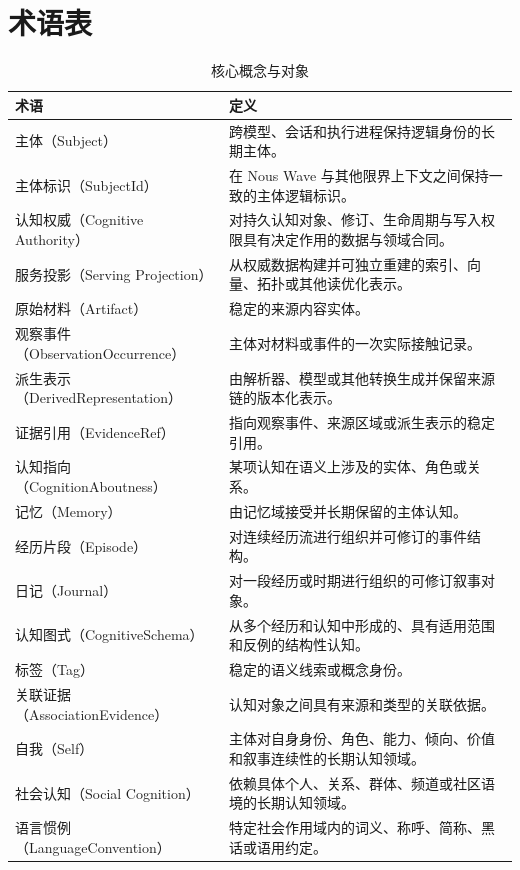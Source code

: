 \chapter{术语表}

\begin{longtable}{>{\raggedright\arraybackslash}p{4.7cm}>{\raggedright\arraybackslash}p{9.1cm}}
\caption{核心概念与对象}\label{tab:glossary}\\
\toprule
\textbf{术语} & \textbf{定义}\\
\midrule
主体（Subject） & 跨模型、会话和执行进程保持逻辑身份的长期主体。\\
主体标识（SubjectId） & 在 Nous Wave 与其他限界上下文之间保持一致的主体逻辑标识。\\
认知权威（Cognitive Authority） & 对持久认知对象、修订、生命周期与写入权限具有决定作用的数据与领域合同。\\
服务投影（Serving Projection） & 从权威数据构建并可独立重建的索引、向量、拓扑或其他读优化表示。\\
原始材料（Artifact） & 稳定的来源内容实体。\\
观察事件（ObservationOccurrence） & 主体对材料或事件的一次实际接触记录。\\
派生表示（DerivedRepresentation） & 由解析器、模型或其他转换生成并保留来源链的版本化表示。\\
证据引用（EvidenceRef） & 指向观察事件、来源区域或派生表示的稳定引用。\\
认知指向（CognitionAboutness） & 某项认知在语义上涉及的实体、角色或关系。\\
记忆（Memory） & 由记忆域接受并长期保留的主体认知。\\
经历片段（Episode） & 对连续经历流进行组织并可修订的事件结构。\\
日记（Journal） & 对一段经历或时期进行组织的可修订叙事对象。\\
认知图式（CognitiveSchema） & 从多个经历和认知中形成的、具有适用范围和反例的结构性认知。\\
标签（Tag） & 稳定的语义线索或概念身份。\\
关联证据（AssociationEvidence） & 认知对象之间具有来源和类型的关联依据。\\
自我（Self） & 主体对自身身份、角色、能力、倾向、价值和叙事连续性的长期认知领域。\\
社会认知（Social Cognition） & 依赖具体个人、关系、群体、频道或社区语境的长期认知领域。\\
语言惯例（LanguageConvention） & 特定社会作用域内的词义、称呼、简称、黑话或语用约定。\\

\end{longtable}
